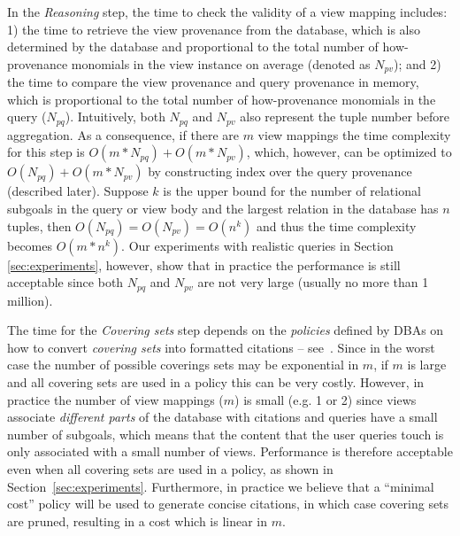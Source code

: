In the {\em Reasoning } step, 
the time to check the validity of a view mapping includes: 1) the time to retrieve the view provenance from the database, which is also determined by the database and proportional to the total number of how-provenance monomials in the view instance on average (denoted as $N_{pv}$); and 2) the time to compare the view provenance and query provenance in memory, which is proportional to the total number of how-provenance monomials in the query ($N_{pq}$). Intuitively, both $N_{pq}$ and $N_{pv}$ also represent the tuple number before aggregation. As a consequence, if there are $m$ view mappings the time complexity for this step is $O(m*N_{pq}) + O(m*N_{pv})$, which, however, can be optimized to $O(N_{pq}) + O(m*N_{pv})$ by constructing index over the query provenance (described later). Suppose $k$ is the upper bound for the number of relational subgoals in the query or view body and the largest relation in the database has $n$ tuples, then $O(N_{pq}) = O(N_{pv}) = O(n^k)$ and thus the time complexity becomes $O(m*n^k)$.  Our experiments with realistic queries in Section \ref{sec:experiments}\eat{~\ref{ssec: realistic}}, however, show that in practice the performance is still acceptable since both $N_{pq}$ and $N_{pv}$ are not very large (usually no more than 1 million).


The time for the {\em Covering sets} step depends on the {\em policies} defined by DBAs on how to convert {\em covering sets} into formatted citations
-- see~\cite{wu2018data}.  
Since in the worst case the number of possible coverings sets may be exponential in $m$, if $m$ is large and all covering sets are used in a policy this can be very costly.  
However, in practice the number of view mappings ($m$) is small (e.g. 1 or 2) since views associate \textit{different parts} of the database with citations and queries have a small number of subgoals, which means that the content that the user queries touch is only associated with a small number of views. Performance is therefore acceptable even when all covering sets are used in a policy, as shown in Section~\ref{sec:experiments}.  Furthermore, in practice we believe that a ``minimal cost'' policy will be used to generate concise citations, in which case covering sets are pruned,  resulting in a cost which is linear in $m$.


